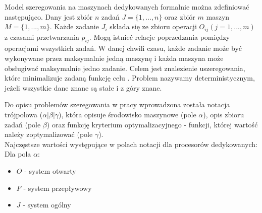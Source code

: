 \documentclass[brudnopis]{xmgr}
\begin{document}
Model szeregowania na maszynach dedykowanych formalnie można zdefiniować następująco. Dany jest zbiór $n$ zadań $J=\{1, ..., n\}$ oraz zbiór $m$ maszyn $M=\{1, ..., m\}$.
Każde zadanie $J_i$ składa się ze zbioru operacji $O_{ij} (j=1, ..., m)$ z czasami przetwarzania $p_{ij}$.
Mogą istnieć relacje poprzedzania pomiędzy operacjami wszystkich zadań.
W danej chwili czasu, każde zadanie może być wykonywane przez maksymalnie jedną maszynę i każda maszyna może obsługiwać maksymalnie jedno zadanie.
Celem jest znalezienie uszeregowania, które minimalizuje zadaną funkcję celu \cite{brucker2007scheduling}. Problem nazywamy deterministycznym, jeżeli wszystkie dane znane są stałe i z góry znane.


Do opisu problemów szeregowania w pracy \cite{graham1979optimization} wprowadzona została notacja trójpolowa ($\alpha|\beta|\gamma$), która opisuje środowisko maszynowe (pole $\alpha$), opis zbioru zadań (pole $\beta$) oraz funkcję kryterium optymalizacyjnego - funkcji, której wartość należy zoptymalizować (pole $\gamma$).\\

Najczęstsze wartości występujące w polach notacji dla procesorów dedykowanych:\\

Dla pola $\alpha$:
\begin{itemize}
    \item $O$ - system otwarty
    \item $F$ - system przepływowy
    \item $J$ - system ogólny
\end{itemize}
\end{document}
